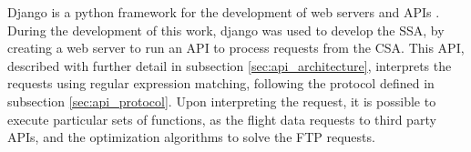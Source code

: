 Django is a python framework for the development of web servers and APIs \cite{django}. During the development of this work, django was used to develop the SSA, by creating a web server to run an API to process requests from the CSA. This API, described with further detail in subsection \ref{sec:api_architecture}, interprets the requests using regular expression matching, following the protocol defined in subsection \ref{sec:api_protocol}. Upon interpreting the request, it is possible to execute particular sets of functions, as the flight data requests to third party APIs, and the optimization algorithms to solve the FTP requests.
